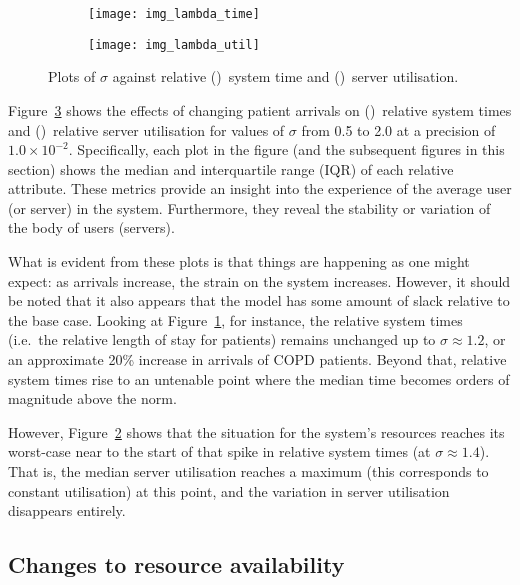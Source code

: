 \begin{figure}
    \centering
    \begin{subfigure}{.5\imgwidth}
        \texttt{[image: img\_lambda\_time]}
        \caption{}\label{fig:lambda_time}
    \end{subfigure}\hfill%
    \begin{subfigure}{.5\imgwidth}
        \texttt{[image: img\_lambda\_util]}
        \caption{}\label{fig:lambda_util}
    \end{subfigure}
    \caption{%
        Plots of \(\sigma\) against relative ()~system
        time and ()~server utilisation.
    }\label{fig:lambda}
\end{figure}

Figure~\ref{fig:lambda} shows the effects of changing patient arrivals on
()~relative system times and
()~relative server utilisation for values of \(\sigma\)
from 0.5 to 2.0 at a precision of \(1.0 \times 10^{-2}\). Specifically, each
plot in the figure (and the subsequent figures in this section) shows the median
and interquartile range (IQR) of each relative attribute. These metrics provide
an insight into the experience of the average user (or server) in the system.
Furthermore, they reveal the stability or variation of the body of users
(servers).

What is evident from these plots is that things are happening as one might
expect: as arrivals increase, the strain on the system increases. However, it
should be noted that it also appears that the model has some amount of slack
relative to the base case. Looking at Figure~\ref{fig:lambda_time}, for
instance, the relative system times (i.e.\ the relative length of stay for
patients) remains unchanged up to \(\sigma \approx 1.2\), or an approximate 20\%
increase in arrivals of COPD patients. Beyond that, relative system times rise
to an untenable point where the median time becomes orders of magnitude above
the norm.

However, Figure~\ref{fig:lambda_util} shows that the situation for the system's
resources reaches its worst-case near to the start of that spike in relative
system times (at \(\sigma \approx 1.4\)). That is, the median server utilisation
reaches a maximum (this corresponds to constant utilisation) at this point, and
the variation in server utilisation disappears entirely.


\subsection{Changes to resource availability}\label{subsec:resources}


